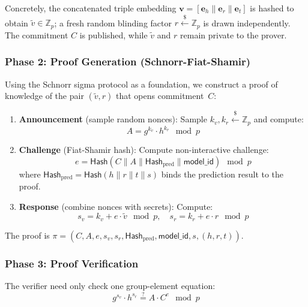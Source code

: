 \documentclass[conference, 10pt]{IEEEtran}
\newcommand{\Z}{\mathbb{Z}}
\newcommand{\Hash}{\mathsf{Hash}}
\newcommand{\embed}{\mathbf{e}}
\newcommand{\vect}[1]{\mathbf{#1}}
\begin{document}
Concretely, the concatenated triple embedding $\vect{v} = [\embed_h \| \embed_r \| \embed_t]$ is hashed to obtain $\tilde{v} \in \Z_p$; a fresh random blinding factor $r \xleftarrow{\$} \Z_p$ is drawn independently. The commitment $C$ is published, while $\tilde{v}$ and $r$ remain private to the prover.

\subsubsection{Phase 2: Proof Generation (Schnorr-Fiat-Shamir)}

Using the Schnorr sigma protocol as a foundation, we construct a proof of knowledge of the pair $(\tilde{v}, r)$ that opens commitment~$C$:

\begin{enumerate}
    \item \textbf{Announcement} (sample random nonces): Sample $k_v, k_r \xleftarrow{\$} \Z_p$ and compute:
    \begin{equation}
        A = g^{k_v} \cdot h^{k_r} \mod p
        \label{eq:announcement}
    \end{equation}

    \item \textbf{Challenge} (Fiat-Shamir hash): Compute non-interactive challenge:
    \begin{equation}
        e = \Hash(C \| A \| \Hash_{\text{pred}} \| \mathsf{model\_id}) \mod p
        \label{eq:challenge}
    \end{equation}
    where $\Hash_{\text{pred}} = \Hash(h \| r \| t \| s)$ binds the prediction result to the proof.

    \item \textbf{Response} (combine nonces with secrets): Compute:
    \begin{equation}
        s_v = k_v + e \cdot \tilde{v} \mod p, \quad s_r = k_r + e \cdot r \mod p
        \label{eq:response}
    \end{equation}
\end{enumerate}

The proof is $\pi = (C, A, e, s_v, s_r, \Hash_{\text{pred}}, \mathsf{model\_id}, s, (h,r,t))$.

\subsubsection{Phase 3: Proof Verification}

The verifier need only check one group-element equation:
\begin{equation}
    g^{s_v} \cdot h^{s_r} \stackrel{?}{=} A \cdot C^e \mod p
    \label{eq:verify}
\end{equation}
\end{document}
